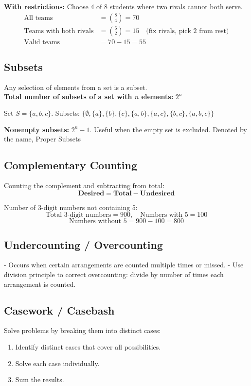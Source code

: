 \documentclass[12pt]{extarticle}
\begin{document}
\begin{examplebox}
\textbf{With restrictions:} Choose 4 of 8 students where two rivals cannot both serve. 
\begin{align*}
\text{All teams} &= \binom{8}{4} = 70 \\
\text{Teams with both rivals} &= \binom{6}{2} = 15 \quad \text{(fix rivals, pick 2 from rest)} \\
\text{Valid teams} &= 70 - 15 = 55
\end{align*}
\end{examplebox}

\subsection{Subsets}
Any selection of elements from a set is a subset.\\
\textbf{Total number of subsets of a set with $n$ elements:} $2^n$

\begin{examplebox}
Set $S = \{a,b,c\}$. Subsets: $\{\emptyset, \{a\}, \{b\}, \{c\}, \{a,b\}, \{a,c\}, \{b,c\}, \{a,b,c\}\}$
\end{examplebox}

\begin{remarkbox}
\textbf{Nonempty subsets:} $2^n-1$. Useful when the empty set is excluded. Denoted by the name, Proper Subsets
\end{remarkbox}

\subsection{Complementary Counting}
Counting the complement and subtracting from total:
\[
 \textbf{Desired} = \textbf{Total} - \textbf{Undesired}
\]
\begin{examplebox}
Number of 3-digit numbers not containing 5:
\[
\text{Total 3-digit numbers} = 900, \quad \text{Numbers with 5} = 100
\]
\[
\text{Numbers without 5} = 900-100 = 800
\]
\end{examplebox}

\subsection{Undercounting / Overcounting}
- Occurs when certain arrangements are counted multiple times or missed.  
- Use division principle to correct overcounting: divide by number of times each arrangement is counted.

\subsection{Casework / Casebash}
Solve problems by breaking them into distinct cases:
\begin{enumerate}
    \item Identify distinct cases that cover all possibilities.
    \item Solve each case individually.
    \item Sum the results.
\end{enumerate}
\end{document}
